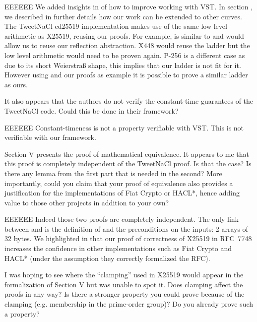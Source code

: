 \begin{answer}{EEEEEE}
  We added insights in  of how to improve
  working with VST. In section ,
  we described in further details how our work can
  be extended to other curves. The TweetNaCl ed25519
  implementation makes use of the same low level arithmetic
  as X25519, reusing our proofs. For example,  is
  similar to  and would allow us to reuse our
  reflection abstraction. X448 would reuse the ladder but the
  low level arithmetic would need to be proven again. P-256
  is a different case as due to its short Weierstra\ss{} shape, this
  implies that our ladder is not fit for it. However using \cite{BartziaS14}
  and our proofs as example it is possible to prove a similar
  ladder as ours.
\end{answer}

It also appears that the authors do not verify the constant-time
guarantees of the TweetNaCl code. Could this be done
in their framework?

\begin{answer}{EEEEEE}
  Constant-timeness is not a property verifiable with VST.
  This is not verifiable with our framework.
\end{answer}

Section V presents the proof of mathematical equivalence.
It appears to me that this proof is completely independent of
the TweetNaCl proof. Is that the case? Is there any lemma
from the first part that is needed in the second? More
importantly, could you claim that your proof of equivalence also
provides a justification for the implementations of Fiat Crypto
or HACL*, hence adding value to those other projects in addition
to your own?

\begin{answer}{EEEEEE}
  Indeed those two proofs are completely independent. The
  only link between  and  is the definition
  of  and the preconditions on the inputs: 2 arrays of
  32 bytes. We highlighted in  that our proof of
  correctness of X25519 in RFC~7748 increases the confidence
  in other implementations such as Fiat Crypto and HACL*
  (under the assumption they correctly formalized the RFC).
\end{answer}

I was hoping to see where the ``clamping'' used in X25519
would appear in the formalization of Section V but was unable
to spot it. Does clamping affect the proofs in any way? Is there
a stronger property you could prove because of the clamping
(e.g. membership in the prime-order group)? Do you already
prove such a property?

